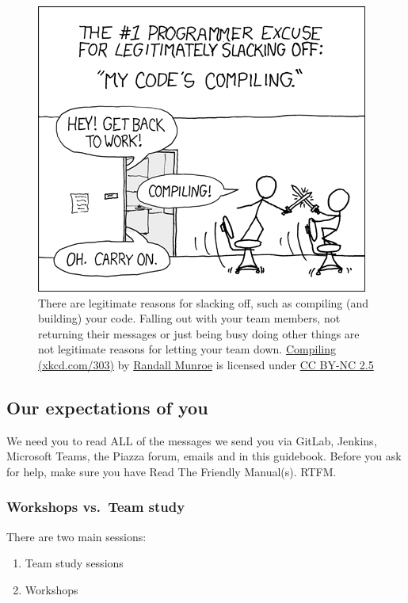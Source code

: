 \documentclass[
]{book}
\providecommand{\tightlist}{%
  \setlength{\itemsep}{0pt}\setlength{\parskip}{0pt}}
\begin{document}
\begin{figure}

{\centering \includegraphics[width=0.75\linewidth]{images/compiling} 

}

\caption{There are legitimate reasons for slacking off, such as compiling (and building) your code. Falling out with your team members, not returning their messages or just being busy doing other things are not legitimate reasons for letting your team down. \href{https://xkcd.com/303/}{Compiling (xkcd.com/303)} by \href{https://en.wikipedia.org/wiki/Randall_Munroe}{Randall Munroe} is licensed under \href{https://creativecommons.org/licenses/by-nc/2.5/}{CC BY-NC 2.5}}\label{fig:xkcd-compiling-fig}
\end{figure}



\hypertarget{rtfm}{%
\subsection{Our expectations of you}\label{rtfm}}

We need you to read ALL of the messages we send you via GitLab, Jenkins, Microsoft Teams, the Piazza forum, emails and in this guidebook. Before you ask for help, make sure you have Read The Friendly Manual(s). RTFM.

\hypertarget{workshops}{%
\subsubsection{Workshops vs.~Team study}\label{workshops}}

There are two main sessions:

\begin{enumerate}
\def\labelenumi{\arabic{enumi}.}
\tightlist
\item
  Team study sessions
\item
  Workshops
\end{enumerate}
\end{document}
